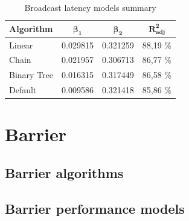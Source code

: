 \documentclass{article}
\begin{document}
\begin{table}[h]
    \centering
    \begin{tabular}{|l|c|c|c|}
        \hline
        \textbf{Algorithm} & $\boldsymbol{\beta_1}$ & $\boldsymbol{\beta_2}$ & $\boldsymbol{R^2_{adj}}$\\[0.1cm]
        \hline
        Linear      & 0.029815 & 0.321259 & 88,19 \% \\
        Chain       & 0.021957 & 0.306713 & 86,77 \% \\
        Binary Tree & 0.016315 & 0.317449 & 86,58 \% \\
        Default     & 0.009586 & 0.321418 & 85,86 \% \\
        \hline
    \end{tabular}
    \caption{Broadcast latency models summary}
    \label{tab:bcast_summaries}
\end{table}
\section{Barrier}
\subsection{Barrier algorithms}
\subsection{Barrier performance models}
\newpage


\end{document}
